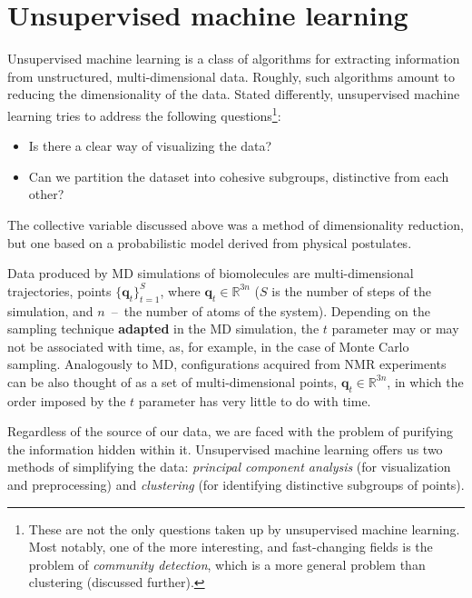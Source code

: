 \documentclass[a4paper,11pt,twoside]{book}%
\begin{document}
\section{Unsupervised machine learning}


Unsupervised machine learning is a class of algorithms for extracting information from unstructured, multi-dimensional data.
Roughly, such algorithms amount to reducing the dimensionality of the data.
Stated differently, unsupervised machine learning tries to address the following questions\footnote{
These are not the only questions taken up by unsupervised machine learning.
Most notably, one of the more interesting, and fast-changing fields is the problem of \emph{community detection}, which is a more general problem than clustering (discussed further).}:
\begin{itemize}
 \item Is there a clear way of visualizing the data?
 \item Can we partition the dataset into cohesive subgroups, distinctive from each other?
\end{itemize}
The collective variable discussed above was a method of dimensionality reduction, but one based on a probabilistic model derived from physical postulates.

Data produced by MD simulations of biomolecules are multi-dimensional trajectories, points $\{ \mathbf{q}_t \}_{t=1}^S$, where $\mathbf{q}_t\in\mathbb{R}^{3n}$ ($S$ is the number of steps of the simulation, and $n$~--~the number of atoms of the system).
Depending on the sampling technique {\bf adapted} in the MD simulation, the $t$ parameter may or may not be associated with time, as, for example, in the case of Monte Carlo sampling.
Analogously to MD, configurations acquired from NMR experiments can be also thought of as a set of multi-dimensional points, $\mathbf{q}_t\in\mathbb{R}^{3n}$, in which the order imposed by the $t$ parameter has very little to do with time.

Regardless of the source of our data, we are faced with the problem of purifying the information hidden within it.
Unsupervised machine learning offers us two methods of simplifying the data: \emph{principal component analysis} (for visualization and preprocessing) and \emph{clustering} (for identifying distinctive subgroups of points).
\end{document}
